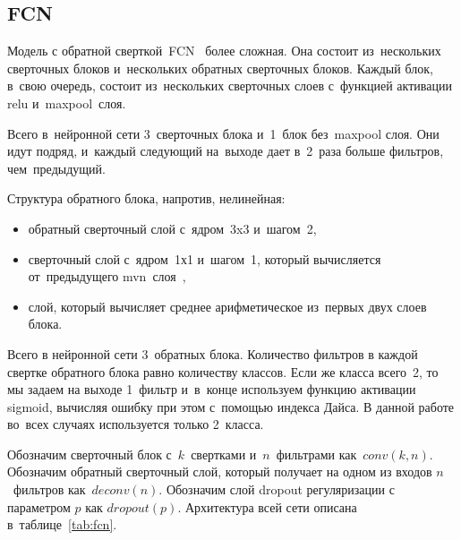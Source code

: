 \subsection{FCN}
 
Модель с обратной сверткой~FCN~\cite{fcn} более сложная. Она состоит из~нескольких сверточных блоков и~нескольких обратных сверточных блоков. Каждый блок, в~свою очередь, состоит из~нескольких сверточных слоев с~функцией активации relu и~maxpool~слоя. 

Всего в~нейронной сети 3~сверточных блока и~1~блок без~maxpool слоя. Они идут подряд, и~каждый следующий на~выходе дает в~2~раза больше фильтров, чем~предыдущий. 

Структура обратного блока, напротив, нелинейная:

\begin{itemize}
  \item обратный сверточный слой с~ядром~3x3 и~шагом~2,
  \item сверточный слой с~ядром~1х1 и~шагом~1, который вычисляется от~предыдущего mvn~слоя~\cite{batch_norm},
  \item слой, который вычисляет среднее арифметическое из~первых двух слоев блока.
\end{itemize}

Всего в нейронной сети 3~обратных блока. Количество фильтров в каждой свертке обратного блока равно количеству классов. Если же класса всего~2, то мы задаем на выходе 1~фильтр и~в~конце используем функцию активации sigmoid, вычисляя ошибку при этом с~помощью индекса Дайса. В данной работе во~всех случаях используется только 2~класса.

Обозначим сверточный блок с~$k$~свертками и~$n$~фильтрами как~$conv(k,n)$. Обозначим обратный сверточный слой, который получает на одном из входов $n$~фильтров как~$deconv(n)$. Обозначим слой dropout регуляризации с параметром $p$ как $dropout(p)$. Архитектура всей сети описана в~таблице~\ref{tab:fcn}.

